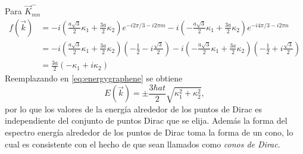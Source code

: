 Para $\vec{K}^{-}_{mn}$
\begin{align}
	\nonumber f(\vec{k}) & = -i \left(\frac{a\sqrt{3}}{2}\kappa_1+\frac{3a}{2}\kappa_2\right)e^{-i 2\pi/3-i2\pi m}-i \left(-\frac{a\sqrt{3}}{2}\kappa_1 + \frac{3a}{2}\kappa_2\right)e^{-i 4\pi/3-i2\pi n}                                                     \\
	\nonumber            & = -i \left(\frac{a\sqrt{3}}{2}\kappa_1+\frac{3a}{2}\kappa_2\right)\left(-\frac{1}{2}-i \frac{\sqrt{3}}{2} \right)-i \left(-\frac{a\sqrt{3}}{2}\kappa_1 + \frac{3a}{2}\kappa_2\right)\left(-\frac{1}{2}+i \frac{\sqrt{3}}{2} \right) \\
                       & =  \frac{3a}{2}\left(-\kappa_1+i\kappa_2\right)\label{EQ:firstApproxEnergy2}
\end{align}
Reemplazando en \eqref{eq:energygraphene} se obtiene 
\begin{equation}
   E(\vec{k}) = \pm \frac{3\hbar a t}{2} \sqrt{\kappa_1^2 + \kappa_2^2},
\end{equation}
por lo que los valores de la energía alrededor de los puntos de Dirac es independiente del conjunto de puntos Dirac que se elija. Además la forma del espectro energía alrededor de los puntos de Dirac toma la forma de un cono, lo cual es consistente con el hecho de que sean llamados como \emph{conos de Dirac}.
